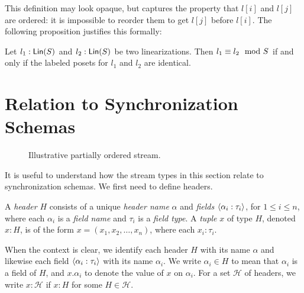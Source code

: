 This definition may look opaque, but captures the property that $l[i]$ and $l[j]$ are ordered: it is impossible to reorder them to get $l[j]$ before $l[i]$. The following proposition justifies this formally:
\begin{proposition}
Let $l_1: \mathsf{Lin}({S})$ and $l_2: \mathsf{Lin}({S})$ be two linearizations.
Then $l_1 \equiv l_2 \mod {S}$ if and only if the labeled posets for $l_1$
and $l_2$ are identical.
\end{proposition}


\section{Relation to Synchronization Schemas}
\label{45:ssec:illustrative-example}

\begin{figure}
    \centering
    \caption{Illustrative partially ordered stream.}
    \label{45:fig:gps-sps}
\end{figure}

It is useful to understand how the stream types in this section relate to synchronization schemas.
We first need to define headers.
\begin{definition}
A \emph{header} $H$
consists of a unique \emph{header name} \(\alpha\)
and \emph{fields} \(\left\langle\alpha_i: \tau_i\right\rangle\), for $1\le i\le n$,
where each \(\alpha_i\) is a \emph{field name}
and \(\tau_i\) is a \emph{field type}.
A \emph{tuple} $x$ of type \(H\), denoted $x : H$, is of the form
\(x = (x_1, x_2, \ldots, x_n)\), where each \(x_i : \tau_i\).
\end{definition}

When the context is clear, we identify each header \(H\) with its name \(\alpha\)
and likewise each field \(\left\langle\alpha_i: \tau_i\right\rangle\) with its name \(\alpha_i\).
We write \(\alpha_i \in H\) to mean that \(\alpha_i\) is a field of \(H\), and
\(x.\alpha_i\) to denote the value of \(x\) on \(\alpha_i\).
For a set $\mathcal{H}$ of headers, we write
$x: \mathcal{H}$ if $x : H$ for some $H \in \mathcal{H}$.

